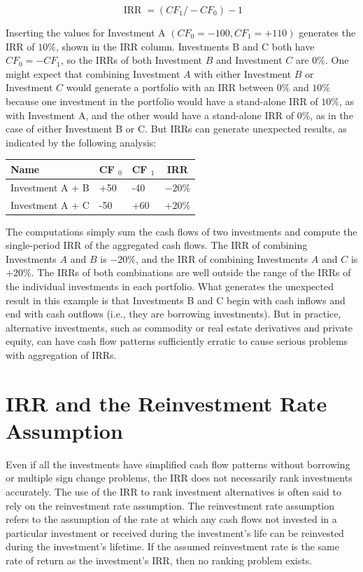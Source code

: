 \documentclass[11pt]{article}
\begin{document}
$$
\operatorname{IRR}=\left(C F_{1} /-C F_{0}\right)-1
$$

Inserting the values for Investment A $\left(C F_{0}=-100, C F_{1}=+110\right)$ generates the IRR of $10 \%$, shown in the IRR column. Investments $\mathrm{B}$ and $\mathrm{C}$ both have $C F_{0}=-C F_{1}$, so the IRRs of both Investment $B$ and Investment $C$ are $0 \%$. One might expect that combining Investment $A$ with either Investment $B$ or Investment $C$ would generate a portfolio with an IRR between $0 \%$ and $10 \%$ because one investment in the portfolio would have a stand-alone IRR of $10 \%$, as with Investment A, and the other would have a stand-alone IRR of 0\%, as in the case of either Investment B or C. But IRRs can generate unexpected results, as indicated by the following analysis:

\begin{center}
\begin{tabular}{|lllc|}
\hline
Name & CF $_{0}$ & CF $_{1}$ & IRR \\
\hline
Investment A + B & +50 & -40 & $-20 \%$ \\
Investment A + C & -50 & +60 & $+20 \%$ \\
\hline
\end{tabular}
\end{center}

The computations simply sum the cash flows of two investments and compute the single-period IRR of the aggregated cash flows. The IRR of combining Investments $A$ and $B$ is $-20 \%$, and the IRR of combining Investments $A$ and $C$ is $+20 \%$. The IRRs of both combinations are well outside the range of the IRRs of the individual investments in each portfolio. What generates the unexpected result in this example is that Investments B and $\mathrm{C}$ begin with cash inflows and end with cash outflows (i.e., they are borrowing investments). But in practice, alternative investments, such as commodity or real estate derivatives and private equity, can have cash flow patterns sufficiently erratic to cause serious problems with aggregation of IRRs.

\section*{IRR and the Reinvestment Rate Assumption}
Even if all the investments have simplified cash flow patterns without borrowing or multiple sign change problems, the IRR does not necessarily rank investments accurately. The use of the IRR to rank investment alternatives is often said to rely on the reinvestment rate assumption. The reinvestment rate assumption refers to the assumption of the rate at which any cash flows not invested in a particular investment or received during the investment's life can be reinvested during the investment's lifetime. If the assumed reinvestment rate is the same rate of return as the investment's IRR, then no ranking problem exists.
\end{document}
